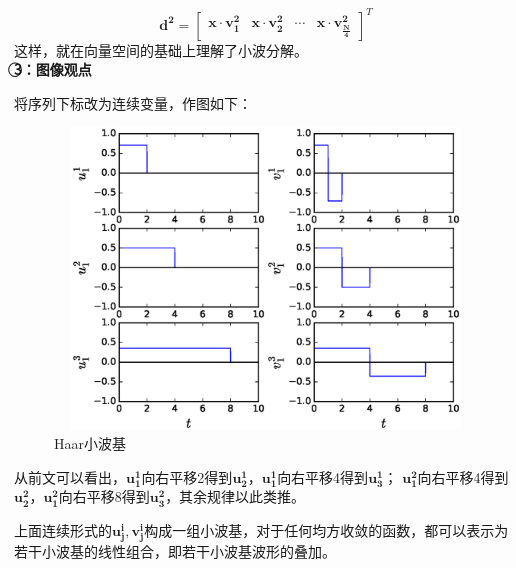 \documentclass{article}
\begin{document}
\begin{CJK}{UTF8}{gbsn}
	$$\boldsymbol{d^2}=\begin{bmatrix}\boldsymbol{x}\cdot\boldsymbol{v^2_1}&\boldsymbol{x}\cdot\boldsymbol{v^2_2}&\cdots&\boldsymbol{x}\cdot\boldsymbol{v^2_{\frac{N}{4}}}\end{bmatrix}^T$$
	这样，就在向量空间的基础上理解了小波分解。\\	
	\textbf{\textcircled{3}：图像观点}\par
	将序列下标改为连续变量，作图如下：
\begin{figure}[H]
\centering
\includegraphics[height=8cm,width=12cm]{./figs/fig4.eps}
\caption{Haar小波基}
\label{4}
\end{figure}
	从前文可以看出，$\boldsymbol{u^1_1}$向右平移2得到$\boldsymbol{u^1_2}$，$\boldsymbol{u^1_1}$向右平移4得到$\boldsymbol{u^1_3}$；
	$\boldsymbol{u^2_1}$向右平移4得到$\boldsymbol{u^2_2}$，$\boldsymbol{u^2_1}$向右平移8得到$\boldsymbol{u^2_3}$，其余规律以此类推。\par
	上面连续形式的$\boldsymbol{u^i_j},\boldsymbol{v^i_j}$构成一组小波基，对于任何均方收敛的函数，都可以表示为若干小波基的线性组合，即若干小波基波形的叠加。\\
	


\end{CJK}
\end{document}
